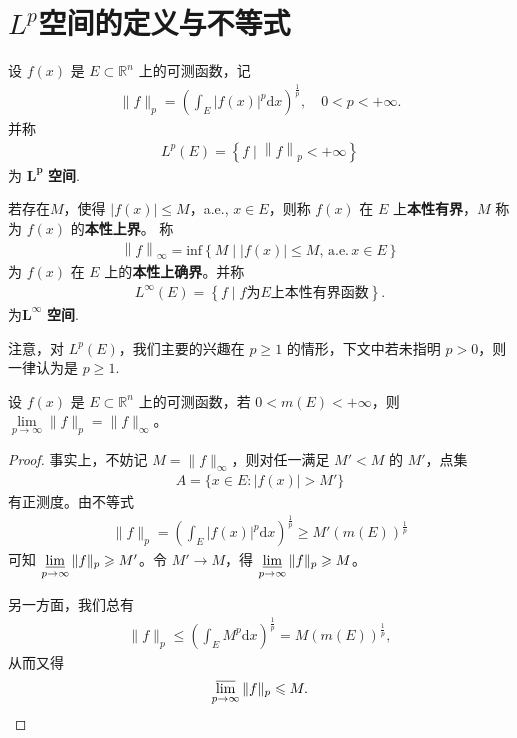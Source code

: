 \documentclass[../../main.tex]{subfiles}%
\begin{document}
\section{$L^p$空间的定义与不等式}

\begin{definition}[$L^p$空间]
设 $f(x)$ 是 $E\subset\mathbb{R}^n$ 上的可测函数，记
\begin{align*}
\|f\|_p = \left(\int_E |f(x)|^p \mathrm{d}x\right)^{\frac{1}{p}},\quad 0 < p < +\infty.
\end{align*}
并称
\begin{align*}
L^p\left( E \right) =\left\{ f\mid \left\| f \right\| _p<+\infty \right\} 
\end{align*}
为 $\boldsymbol{L}^{\boldsymbol{p}}$ \textbf{空间}.

若存在$M$，使得 $|f(x)| \leqslant M$，a.e., $x\in E$，则称 $f(x)$ 在 $E$ 上\textbf{本性有界}，$M$ 称为 $f(x)$ 的\textbf{本性上界}。
称
\begin{align*}
\left\| f \right\| _{\infty}=\mathrm{inf}\left\{ M\mid \left| f\left( x \right) \right|\leqslant M,\,\mathrm{a}.\mathrm{e}.\,x\in E \right\} 
\end{align*}
为 $f(x)$ 在 $E$ 上的\textbf{本性上确界}。并称
\begin{align*}
L^{\infty}\left( E \right) =\left\{ f\mid f\text{为}E\text{上本性有界函数} \right\} .
\end{align*}
为$\boldsymbol{L}^{\boldsymbol{\infty}}$ \textbf{空间}.
\end{definition}
\begin{remark}
注意，对 $L^p(E)$，我们主要的兴趣在 $p\geqslant 1$ 的情形，下文中若未指明 $p>0$，则一律认为是 $p\geqslant 1$.
\end{remark}

\begin{proposition}\label{proposition:fp极限就是f无穷}
设 $f(x)$ 是 $E\subset\mathbb{R}^n$ 上的可测函数，若 $0 < m(E) < +\infty$，则 $\lim\limits_{p\to\infty} \|f\|_p = \|f\|_\infty$。
\end{proposition}
\begin{proof}
事实上，不妨记 $M = \|f\|_\infty$，则对任一满足 $M' < M$ 的 $M'$，点集
\begin{align*}
A = \{x\in E: |f(x)| > M'\}
\end{align*}
有正测度。由不等式
\begin{align*}
\|f\|_p = \left(\int_E |f(x)|^p \mathrm{d}x\right)^{\frac{1}{p}} \geqslant M'(m(E))^{\frac{1}{p}}
\end{align*}
可知 $\varliminf\limits_{p\to\infty} \|f\|_p \geqslant M'$。令 $M'\to M$，得 $\varliminf\limits_{p\to\infty} \|f\|_p \geqslant M$。

另一方面，我们总有
\begin{align*}
\|f\|_p \leqslant \left(\int_E M^p \mathrm{d}x\right)^{\frac{1}{p}} = M(m(E))^{\frac{1}{p}},
\end{align*}
从而又得
\begin{align*}
\varlimsup\limits_{p\to\infty} \|f\|_p \leqslant M.
\end{align*}
\end{proof}
\end{document}
